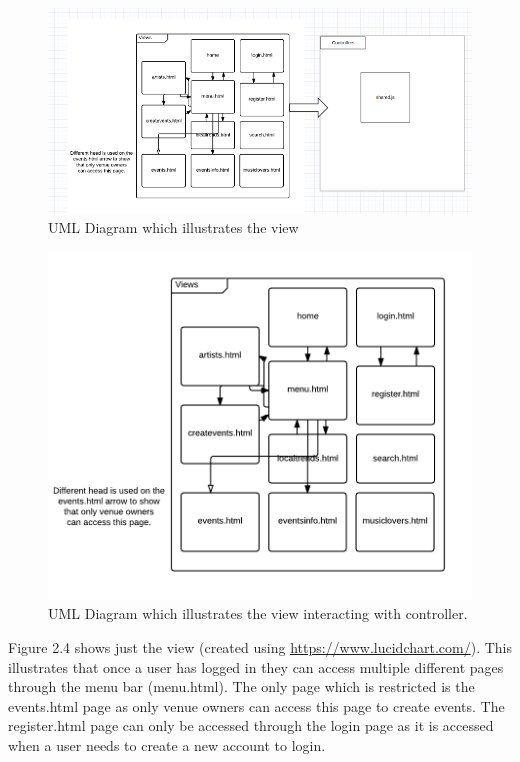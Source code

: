 \begin{center}
\begin{figure}[H]
\includegraphics[width=\textwidth,height=\textheight,keepaspectratio]{images/systemdesign}
\caption{UML Diagram which illustrates the view}
\end{figure}
\begin{figure}[H]
\includegraphics[width=\textwidth,height=\textheight,keepaspectratio]{images/va}
\caption{UML Diagram which illustrates the view interacting with controller.}
\end{figure}
\end{center}
Figure 2.4 shows just the view (created using \url{https://www.lucidchart.com/}). This illustrates that once a user has logged in they can access multiple different pages through the menu bar (menu.html). The only page which is restricted is the events.html page as only venue owners can access this page to create events. The register.html page can only be accessed through the login page as it is accessed when a user needs to create a new account to login.

